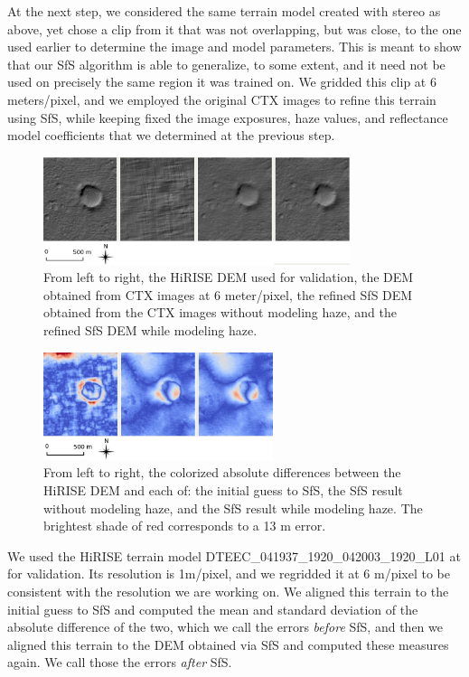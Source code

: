\documentclass[draft,linenumbers]{agujournal}
\begin{document}
At the next step, we considered the same terrain model created with stereo as above, yet chose a clip from it that was not overlapping, but was close, to the one used earlier to determine the image and model parameters. This is meant to show that our SfS algorithm is able to generalize, to some extent, and it need not be used on precisely the same region it was trained on. We gridded this clip at 6 meters/pixel, and we employed the original CTX images to refine this terrain using SfS, while keeping fixed the image exposures, haze values, and reflectance model coefficients that we determined at the previous step.   

\begin{figure}[h!]
\centering
\includegraphics[width=0.8\textwidth]{sfs_mars_fig2}
\caption[sfs]{From left to right, the HiRISE DEM used for validation, the DEM obtained from CTX images at 6 meter/pixel, the refined SfS DEM obtained from the CTX images without modeling haze, and the refined SfS DEM while modeling haze.}
\label{sfs2}
\end{figure}

\begin{figure}[h!]
\centering
\includegraphics[width=0.6\textwidth]{sfs_mars_fig3}
\caption[sfs]{From left to right, the colorized absolute differences between the HiRISE DEM and each of: the initial guess to SfS, the SfS result without modeling haze, and the SfS result while modeling haze. The brightest shade of red corresponds to a 13 m error.}
\label{sfs3}
\end{figure}

We used the HiRISE terrain model DTEEC\_041937\_1920\_042003\_1920\_L01 at for validation. Its resolution is 1m/pixel, and we regridded it at 6 m/pixel to be consistent with the resolution we are working on. We aligned this terrain to the initial guess to SfS and computed the mean and standard deviation of the absolute difference of the two, which we call the errors \textit{before} SfS, and then we aligned this terrain to the DEM obtained via SfS and computed these measures again. We call those the errors \textit{after} SfS. 
\end{document}
